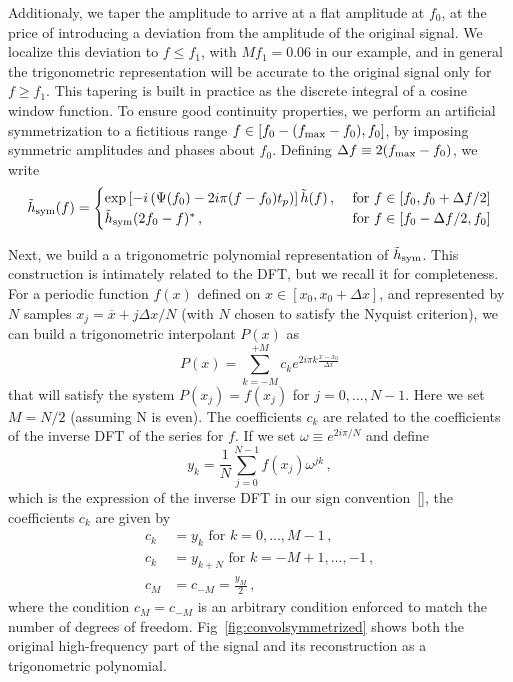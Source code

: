 \documentclass[aps,showpacs,%
prd,superscriptaddress,nofootinbib]{revtex4}
\newcommand{\be}{\begin{equation}}
\newcommand{\ee}{\end{equation}}
\newcommand{\ov}[1]{\overline{#1}}
\newcommand{\nn}{\nonumber}
\begin{document}
Additionaly, we taper the amplitude to arrive at a flat amplitude at $f_{0}$, at the price of introducing a deviation from the amplitude of the original signal. We localize this deviation to $f\leq f_{1}$, with $Mf_{1} = 0.06$ in our example, and in general the trigonometric representation will be accurate to the original signal only for $f\geq f_{1}$. This tapering is built in practice as the discrete integral of a cosine window function. To ensure good continuity properties, we perform an artificial symmetrization to a fictitious range $f\in [f_{0} - (f_{\rm max} - f_{0}), f_{0}]$, by imposing symmetric amplitudes and phases about $f_{0}$. Defining $\Delta f \equiv 2 (f_{\rm max} - f_{0})$, we write 
\be\label{eq:defhsym}
	\tilde{h}_{\rm sym}(f) = 
	\begin{cases} 
		\exp\left[- i \left( \Psi(f_{0}) - 2i\pi (f-f_{0}) t_{p} \right) \right] \tilde{h}(f) \,,  &\text{ for } f \in [f_{0}, f_{0} + \Delta f /2] \\
	\tilde{h}_{\rm sym}(2 f_{0} - f)^{*} \,,  &\text{ for } f \in [f_{0} - \Delta f/2, f_{0}]
	\end{cases}
\ee

Next, we build a a trigonometric polynomial representation of $\tilde{h}_{\rm sym }$. This construction is intimately related to the DFT, but we recall it for completeness. For a periodic function $f(x)$ defined on $x\in [x_{0}, x_{0} + \Delta x]$, and represented by $N$ samples $x_{j} = \ov{x} + j \Delta x/N$ (with $N$ chosen to satisfy the Nyquist criterion), we can build a trigonometric interpolant $P(x)$ as
\be
	P(x) = \sum\limits_{k=-M}^{+M} c_{k} e^{2i\pi k \frac{x-x_{0}}{\Delta x}}
\ee
that will satisfy the system $P(x_{j}) = f(x_{j})$ for $j=0,\dots, N-1$. Here we set $M=N/2$ (assuming N is even). The coefficients $c_{k}$ are related to the coefficients of the inverse DFT of the series for $f$. If we set $\omega \equiv e^{2i\pi/N}$ and define
\be
	y_{k} = \frac{1}{N} \sum\limits_{j=0}^{N-1} f(x_{j}) \omega^{jk} \,,
\ee
which is the expression of the inverse DFT in our sign convention~\eqref{}, the coefficients $c_{k}$ are given by
\begin{align}\label{eq:ckyk}
	c_{k} &= y_{k} \text{ for } k=0,\dots, M-1 \,, \nn\\
	c_{k} &= y_{k+N} \text{ for } k=-M+1,\dots, -1 \,, \nn\\
	c_{M} &= c_{-M} = \frac{y_{M}}{2} \,,
\end{align}
where the condition $c_{M} = c_{-M}$ is an arbitrary condition enforced to match the number of degrees of freedom. Fig~\ref{fig:convolsymmetrized} shows both the original high-frequency part of the signal and its reconstruction as a trigonometric polynomial.
\end{document}
